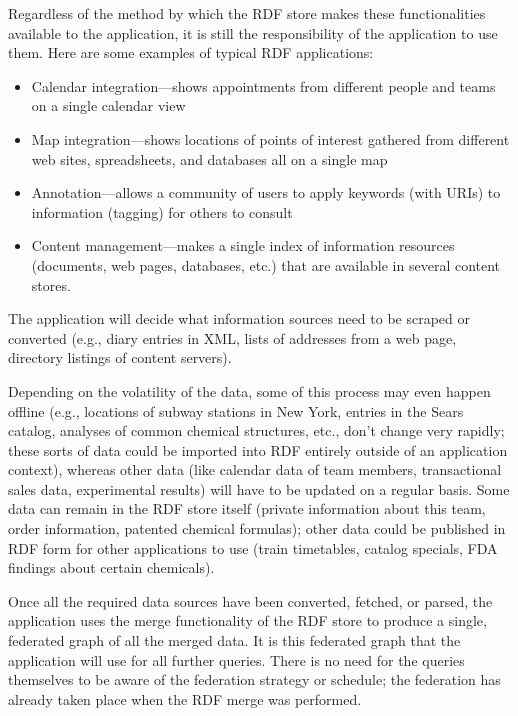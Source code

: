Regardless of the method by which the RDF store makes these
functionalities available to the application, it is still the
responsibility of the application to use them. Here are some examples of
typical RDF applications:

\begin{itemize}
    \item Calendar integration---shows appointments from different people and
teams on a single calendar view
    \item Map integration---shows locations of points of interest gathered from
different web sites, spreadsheets, and databases all on a single map
    \item Annotation---allows a community of users to apply keywords (with URIs)
to information (tagging) for others to consult
    \item Content management---makes a single index of information resources
(documents, web pages, databases, etc.) that are available in several
content stores.
\end{itemize}

The application will decide what information sources need to be scraped
or converted (e.g., diary entries in XML, lists of addresses from a web
page, directory listings of content servers).

Depending on the volatility of the data, some of this process may even
happen offline (e.g., locations of subway stations in New York, entries
in the Sears catalog, analyses of common chemical structures, etc.,
don't change very rapidly; these sorts of data could be imported into
RDF entirely outside of an application context), whereas other data
(like calendar data of team members, transactional sales data,
experimental results) will have to be updated on a regular basis. Some
data can remain in the RDF store itself (private information about this
team, order information, patented chemical formulas); other data could
be published in RDF form for other applications to use (train
timetables, catalog specials, FDA findings about certain chemicals).

Once all the required data sources have been converted, fetched, or
parsed, the application uses the merge functionality of the RDF store to
produce a single, federated graph of all the merged data. It is this
federated graph that the application will use for all further queries.
There is no need for the queries themselves to be aware of the
federation strategy or schedule; the federation has already taken place
when the RDF merge was performed.

